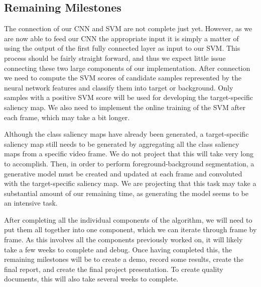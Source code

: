 \documentclass{sig-alternate-05-2015}
\begin{document}
\subsection{Remaining Milestones}
The connection of our CNN and SVM are not complete just yet. However, as we are now able to feed our CNN the appropriate input it is simply a matter of using the output of the first fully connected layer as input to our SVM. This process should be fairly straight forward, and thus we expect little issue connecting these two large components of our implementation. After connection we need to compute the SVM scores of candidate samples represented by the neural network features and classify them into target or background. Only samples with a positive SVM score will be used for developing the target-specific saliency map. We also need to implement the online training of the SVM after each frame, which may take a bit longer.

Although the class saliency maps have already been generated, a target-specific saliency map still needs to be generated by aggregating all the class saliency maps from a specific video frame.
We do not project that this will take very long to accomplish.
Then, in order to perform foreground-background segmentation, a generative model must be created and updated at each frame and convoluted with the target-specific saliency map. We are projecting that this task may take a substantial amount of our remaining time, as generating the model seems to be an intensive task.

After completing all the individual components of the algorithm, we will need to put them all together into one component, which we can iterate through frame by frame.
As this involves all the components previously worked on, it will likely take a few weeks to complete and debug.
Once having completed this, the remaining milestones will be to create a demo, record some results, create the final report, and create the final project presentation.
To create quality documents, this will also take several weeks to complete.



\end{document}
